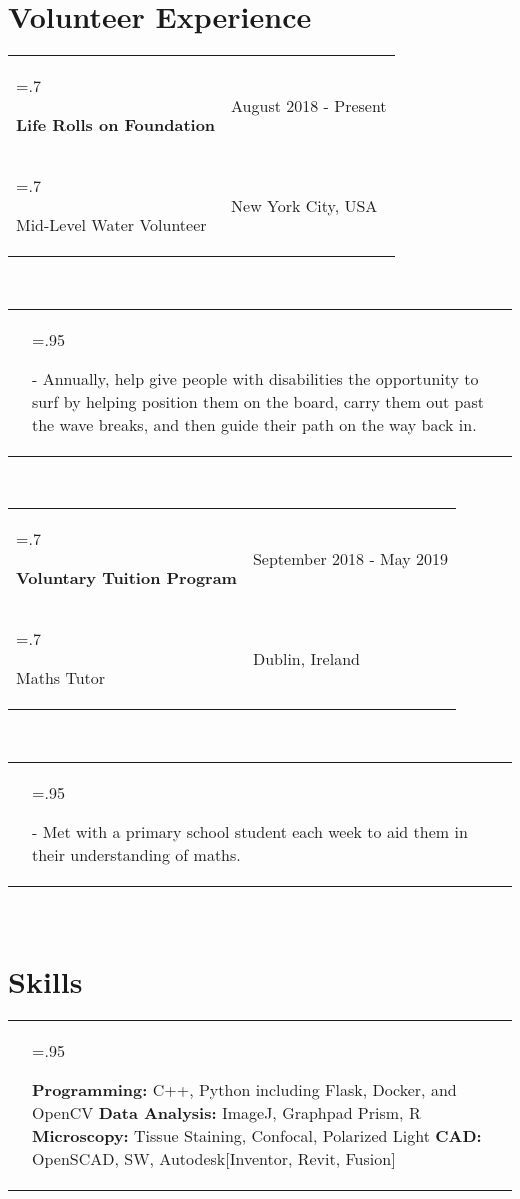 \documentclass[letterpaper,11pt]{article}
\newcommand{\itemHeadings}[4]{
    \begin{tabularx}{\textwidth} {>{\hsize=.7\textwidth\raggedright\arraybackslash}X 
   >{\raggedleft\arraybackslash}X}
      #1 & \small#2 \\
      #3 & \small#4
    \end{tabularx}
    \\
}
\newcommand{\itemitems}[1]{
    \begin{tabularx}{\textwidth} {>{\raggedleft\arraybackslash}X >{\hsize=.95\textwidth\raggedright\arraybackslash}X}
      &- \small#1 \\
    \end{tabularx}
    \\
}
\newcommand{\projitems}[1]{
    \begin{tabularx}{\textwidth} {>{\raggedleft\arraybackslash}X | >{\hsize=.95\textwidth\raggedright\arraybackslash}X}
      & \small#1 \\
    \end{tabularx}
     \\
}
\begin{document}
\section*{Volunteer Experience}
    \itemHeadings
          {\textbf{Life Rolls on Foundation}}
          {August 2018 - Present}
          {Mid-Level Water Volunteer}
          {New York City, USA}
        \itemitems
            {Annually, help give people with disabilities the opportunity to surf by helping position them on the board, carry them out past the wave breaks, and then guide their path on the way back in.}
    \itemHeadings
          {\textbf{Voluntary Tuition Program}}
          {September 2018 - May 2019}
          {Maths Tutor}
          {Dublin, Ireland}
        \itemitems
            {Met with a primary school student each week to aid them in their understanding of maths.} 

\section*{Skills}
    \projitems
        {\textbf{Programming:} C++, Python including Flask, Docker, and OpenCV \textbf{Data Analysis:} ImageJ, Graphpad Prism, R \newline \textbf{Microscopy:} Tissue Staining, Confocal, Polarized Light \textbf{CAD:} OpenSCAD, SW,  Autodesk[Inventor, Revit, Fusion]}


\end{document}
